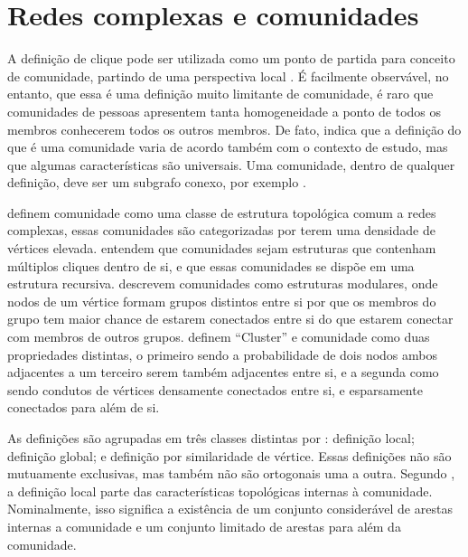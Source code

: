 \documentclass[notes.tex]{subfiles}
\begin{document}
\section{Redes complexas e comunidades\label{sec:redes_complexas}}

A definição de clique pode ser utilizada como um ponto de partida para conceito de comunidade, partindo de uma perspectiva local \cite{fortunato2010community}.
É facilmente observável, no entanto, que essa é uma definição muito limitante de comunidade, é raro que comunidades de pessoas apresentem tanta homogeneidade a ponto de todos os membros conhecerem todos os outros membros.
De fato,  indica que a definição do que é uma comunidade varia de acordo também com o contexto de estudo, mas que algumas características são universais.
Uma comunidade, dentro de qualquer definição, deve ser um subgrafo conexo, por exemplo \cite{fortunato2010community}. 

 definem comunidade como uma classe de estrutura topológica comum a redes complexas, essas comunidades são categorizadas por terem uma densidade de vértices elevada.
 entendem que comunidades sejam estruturas que contenham múltiplos cliques dentro de si, e que essas comunidades se dispõe em uma estrutura recursiva.
 descrevem comunidades como estruturas modulares, onde nodos de um vértice formam grupos distintos entre si por que os membros do grupo tem maior chance de estarem conectados entre si do que estarem conectar com membros de outros grupos.
 definem ``Cluster'' e comunidade como duas propriedades distintas, o primeiro sendo a probabilidade de dois nodos ambos adjacentes a um terceiro serem também adjacentes entre si, e a segunda como sendo condutos de vértices densamente conectados entre si, e esparsamente conectados para além de si.

As definições são agrupadas em três classes distintas por : definição local; definição global; e definição por similaridade de vértice.
Essas definições não são mutuamente exclusivas, mas também não são ortogonais uma a outra.
Segundo , a definição local parte das características topológicas internas à comunidade.
Nominalmente, isso significa a existência de um conjunto considerável de arestas internas a comunidade e um conjunto limitado de arestas para além da comunidade.
\end{document}
